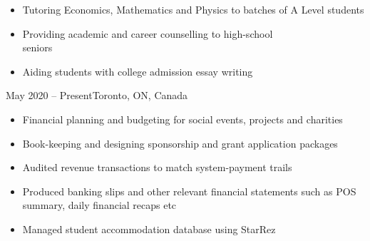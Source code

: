 \documentclass[10pt,a4paper,ragged2e]{altacv}
\begin{document}
\tagline{}

\begin{fullwidth}
\makecvheader
\end{fullwidth}



\begin{itemize}
    \item Tutoring Economics, Mathematics and Physics to batches of A Level students
    \item Providing academic and career counselling to high-school \\ seniors
    \item Aiding students with college admission essay writing
\end{itemize}

\divider

 {May 2020 -- Present}{Toronto, ON, Canada}
\begin{itemize}
    \item Financial planning and budgeting for social events, projects and charities
    \item Book-keeping and designing sponsorship and grant application packages
\end{itemize}

\divider

\begin{itemize}
    \item Audited revenue transactions to match system-payment trails
    \item Produced banking slips and other relevant financial statements such as POS summary, daily financial recaps etc
    \item Managed student accommodation database using StarRez
\end{itemize}
\end{document}
